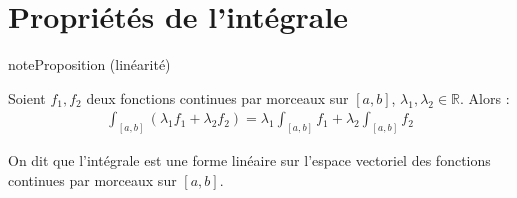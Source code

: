 \documentclass[letterpaper,10pt,french]{jupyterBook}
\begin{document}
\section{Propriétés de l’intégrale}
\label{\detokenize{pptint:proprietes-de-l-integrale}}\label{\detokenize{pptint::doc}}
\begin{sphinxadmonition}{note}{Proposition (linéarité)}

\sphinxAtStartPar
Soient \(f_1, f_2\) deux fonctions continues par morceaux sur \([a, b]\), \(\lambda_1, \lambda_2 \in \mathbb R\). Alors :
\begin{equation*}
\begin{split}
\int_{[a, b]} (\lambda_1f_1 + \lambda_2f_2) = \lambda_1 \int_{[a, b]} f_1 + \lambda_2 \int_{[a, b]} f_2
\end{split}
\end{equation*}\end{sphinxadmonition}

\sphinxAtStartPar
On dit que l’intégrale est une forme linéaire sur l’espace vectoriel des fonctions continues par morceaux sur \([a, b]\).
\end{document}
